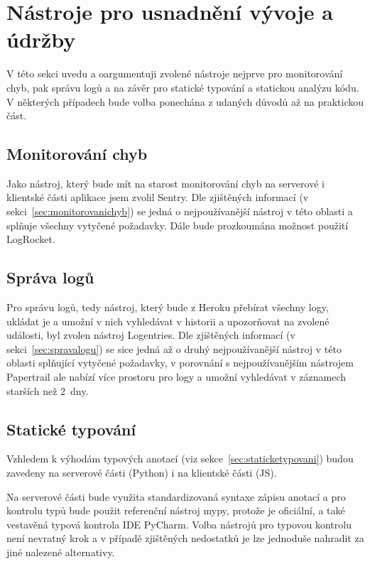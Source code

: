 \section{Nástroje pro usnadnění vývoje a údržby}

V této sekci uvedu a oargumentuji zvolené nástroje nejprve pro monitorování chyb, pak správu logů a na závěr pro statické typování a statickou analýzu kódu. V některých případech bude volba ponechána z udaných důvodů až na praktickou část.

\subsection{Monitorování chyb}

Jako nástroj, který bude mít na starost monitorování chyb na serverové i klientské části aplikace jsem zvolil Sentry. Dle zjištěných informací (v sekci~\ref{sec:monitorovanichyb}) se jedná o nejpoužívanější nástroj v této oblasti a splňuje všechny vytyčené požadavky. Dále bude prozkoumána možnost použití LogRocket.

\subsection{Správa logů}

Pro správu logů, tedy nástroj, který bude z Heroku přebírat všechny logy, ukládat je a umožní v nich vyhledávat v historii a upozorňovat na zvolené události, byl zvolen nástroj Logentries. Dle zjištěných informací (v sekci~\ref{sec:spravalogu}) se sice jedná až o druhý nejpoužívanější nástroj v této oblasti splňující vytyčené požadavky, v porovnání s nejpoužívanějším nástrojem Papertrail ale nabízí více prostoru pro logy a umožní vyhledávat v záznamech starších než 2~dny.

\subsection{Statické typování}

Vzhledem k výhodám typových anotací (viz sekce~\ref{sec:staticketypovani}) budou zavedeny na serverové části (Python) i na klientské části (JS).

Na serverové části bude využita standardizovaná syntaxe zápisu anotací a pro kontrolu typů bude použit referenční nástroj mypy, protože je oficiální, a také vestavěná typová kontrola IDE PyCharm. Volba nástrojů pro typovou kontrolu není nevratný krok a v případě zjištěných nedostatků je lze jednoduše nahradit za jiné nalezené alternativy.

